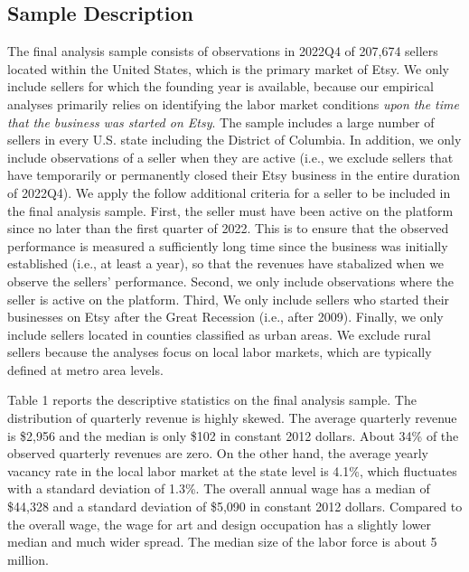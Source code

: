 \documentclass[letterpaper,12pt]{article}
\begin{document}
\subsection{Sample Description}
The final analysis sample consists of observations in 2022Q4 of 207,674 sellers located within the United States, which is the primary market of Etsy. We only include sellers for which the founding year is available, because our empirical analyses primarily relies on identifying the labor market conditions \textit{upon the time that the business was started on Etsy}. The sample includes a large number of sellers in every U.S. state including the District of Columbia. In addition, we only include observations of a seller when they are active (i.e., we exclude sellers that have temporarily or permanently closed their Etsy business in the entire duration of 2022Q4). We apply the follow additional criteria for a seller to be included in the final analysis sample. First, the seller must have been active on the platform since no later than the first quarter of 2022. This is to ensure that the observed performance is measured a sufficiently long time since the business was initially established (i.e., at least a year), so that the revenues have stabalized when we observe the sellers' performance. Second, we only include observations where the seller is active on the platform. Third, We only include sellers who started their businesses on Etsy after the Great Recession (i.e., after 2009). Finally, we only include sellers located in counties classified as urban areas. We exclude rural sellers because the analyses focus on local labor markets, which are typically defined at metro area levels.

 
Table 1 reports the descriptive statistics on the final analysis sample. The distribution of quarterly revenue is highly skewed. The average quarterly revenue is \$2,956 and the median is only \$102 in constant 2012 dollars. About 34\% of the observed quarterly revenues are zero. On the other hand, the average yearly vacancy rate in the local labor market at the state level is 4.1\%, which fluctuates with a standard deviation of 1.3\%. The overall annual wage has a median of \$44,328 and a standard deviation of \$5,090 in constant 2012 dollars. Compared to the overall wage, the wage for art and design occupation has a slightly lower median and much wider spread. The median size of the labor force is about 5 million.
\end{document}

